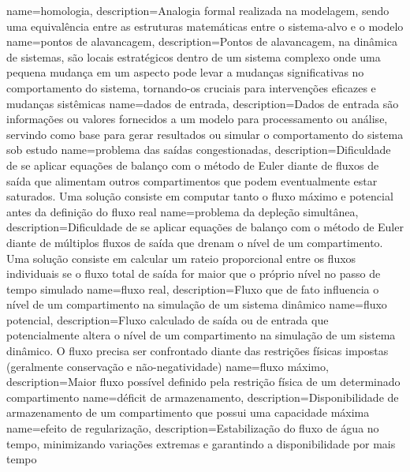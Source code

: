 {
    name=homologia,
    description={Analogia formal realizada na modelagem, sendo uma equivalência entre as estruturas matemáticas entre o sistema-alvo e o modelo}
}
{
    name=pontos de alavancagem,
    description={Pontos de alavancagem, na dinâmica de sistemas, são locais estratégicos dentro de um sistema complexo onde uma pequena mudança em um aspecto pode levar a mudanças significativas no comportamento do sistema, tornando-os cruciais para intervenções eficazes e mudanças sistêmicas}
}
{
    name=dados de entrada,
    description={Dados de entrada são informações ou valores fornecidos a um modelo para processamento ou análise, servindo como base para gerar resultados ou simular o comportamento do sistema sob estudo}
}
{
    name=problema das saídas congestionadas,
    description={Dificuldade de se aplicar equações de balanço com o método de Euler diante de fluxos de saída que alimentam outros compartimentos que podem eventualmente estar saturados. Uma solução consiste em computar tanto o fluxo máximo e potencial antes da definição do fluxo real}
}
{
    name=problema da depleção simultânea,
    description={Dificuldade de se aplicar equações de balanço com o método de Euler diante de múltiplos fluxos de saída que drenam o nível de um compartimento. Uma solução consiste em calcular um rateio proporcional entre os fluxos individuais se o fluxo total de saída for maior que o próprio nível no passo de tempo simulado}
}
{
    name=fluxo real,
    description={Fluxo que de fato influencia o nível de um compartimento na simulação de um sistema dinâmico}
}
{
    name=fluxo potencial,
    description={Fluxo calculado de saída ou de entrada que potencialmente altera o nível de um compartimento na simulação de um sistema dinâmico. O fluxo precisa ser confrontado diante das restrições físicas impostas (geralmente conservação e não-negatividade)}
}
{
    name=fluxo máximo,
    description={Maior fluxo possível definido pela restrição física de um determinado compartimento}
}
{
    name=déficit de armazenamento,
    description={Disponibilidade de armazenamento de um compartimento que possui uma capacidade máxima}
}
{
    name=efeito de regularização,
    description={Estabilização do fluxo de água no tempo, minimizando variações extremas e garantindo a disponibilidade por mais tempo}
}
